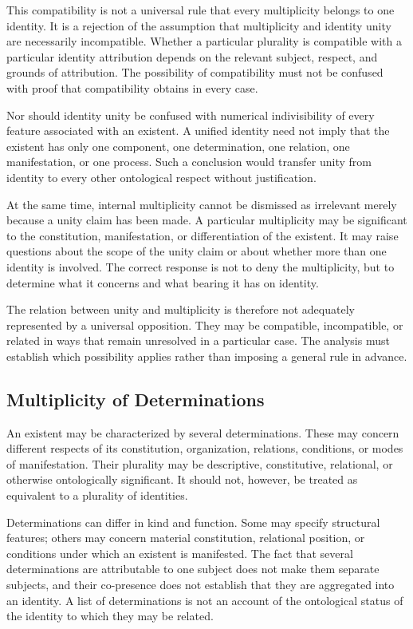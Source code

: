 This compatibility is not a universal rule that every multiplicity
belongs to one identity. It is a rejection of the assumption that
multiplicity and identity unity are necessarily incompatible.
Whether a particular plurality is compatible with a particular
identity attribution depends on the relevant subject, respect, and
grounds of attribution. The possibility of compatibility must not
be confused with proof that compatibility obtains in every case.

Nor should identity unity be confused with numerical indivisibility
of every feature associated with an existent. A unified identity
need not imply that the existent has only one component, one
determination, one relation, one manifestation, or one process.
Such a conclusion would transfer unity from identity to every
other ontological respect without justification.

At the same time, internal multiplicity cannot be dismissed as
irrelevant merely because a unity claim has been made. A particular
multiplicity may be significant to the constitution, manifestation,
or differentiation of the existent. It may raise questions about
the scope of the unity claim or about whether more than one identity
is involved. The correct response is not to deny the multiplicity,
but to determine what it concerns and what bearing it has on identity.

The relation between unity and multiplicity is therefore not
adequately represented by a universal opposition. They may be
compatible, incompatible, or related in ways that remain unresolved
in a particular case. The analysis must establish which possibility
applies rather than imposing a general rule in advance.

\subsection{Multiplicity of Determinations}

An existent may be characterized by several determinations. These
may concern different respects of its constitution, organization,
relations, conditions, or modes of manifestation. Their plurality
may be descriptive, constitutive, relational, or otherwise
ontologically significant. It should not, however, be treated as
equivalent to a plurality of identities.

Determinations can differ in kind and function. Some may specify
structural features; others may concern material constitution,
relational position, or conditions under which an existent is
manifested. The fact that several determinations are attributable
to one subject does not make them separate subjects, and their
co-presence does not establish that they are aggregated into an
identity. A list of determinations is not an account of the
ontological status of the identity to which they may be related.

